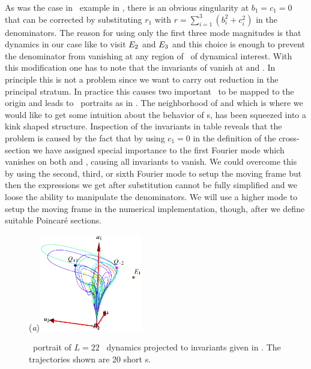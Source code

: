 As was the case in \CLe\ example in ,
there is an obvious singularity at $b_1=c_1=0$ that can be corrected by substituting
$r_1$ with $r=\sum_{i=1}^3 (b_i^2+c_i^2)$ in the denominators.
The reason for using only the first three mode magnitudes is
that dynamics in our case like to visit $E_{2}$ and $E_{3}$
and this choice is enough to prevent the denominator from
vanishing at any region of \statesp\ of dynamical interest.
With this modification one has to note that the invariants of
 vanish at  and . In principle
this is not a problem since we want to carry out reduction in
the principal stratum. In practice this causes two important
\eqva\ to be mapped to the origin and leads to \statesp\
portraits as in . The neighborhood of
 and  which is where we would like to get some
intuition about the behavior of \rpo s, has been squeezed into
a kink shaped structure. Inspection of the invariants in table
 reveals
that the problem is caused by the fact that by using $c_1=0$
in the definition of the cross-section we have
assigned special importance to the first Fourier mode
which vanishes
on both  and , causing all invariants to vanish.
We could overcome this by using the second, third, or sixth Fourier
mode to setup the moving frame but then the expressions we get after
substitution cannot be fully simplified and we loose the ability
to manipulate the denominators. We will use a higher mode to setup the moving
frame in the numerical implementation, though,
after we define suitable Poincar\'e sections.

\begin{figure}[t]
\begin{center}
  (\textit{a})\includegraphics[width=0.4\textwidth]{../figs/ksSO2inv145eqbTo0}
\end{center}
\caption[\KS\  reduced \statesp, modified invariants]
   {\Statesp\ portrait of $L=22$ \KS\ dynamics projected to
   invariants given in . The trajectories
   shown are 20 short \rpo s. }
\label{fig:ksSO2eqbTo0}
\end{figure}

